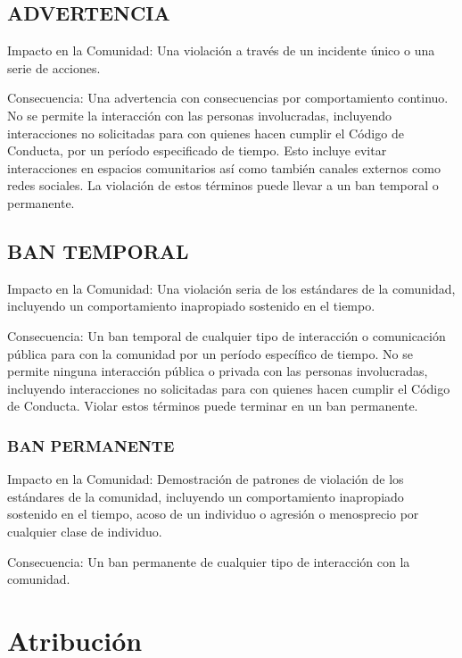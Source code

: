 \documentclass[
]{book}
\begin{document}
\hypertarget{advertencia}{%
\subsection{ADVERTENCIA}\label{advertencia}}

Impacto en la Comunidad: Una violación a través de un incidente único o una serie de acciones.

Consecuencia: Una advertencia con consecuencias por comportamiento continuo. No se permite la interacción con las personas involucradas, incluyendo interacciones no solicitadas para con quienes hacen cumplir el Código de Conducta, por un período especificado de tiempo. Esto incluye evitar interacciones en espacios comunitarios así como también canales externos como redes sociales. La violación de estos términos puede llevar a un ban temporal o permanente.

\hypertarget{ban-temporal}{%
\subsection{BAN TEMPORAL}\label{ban-temporal}}

Impacto en la Comunidad: Una violación seria de los estándares de la comunidad, incluyendo un comportamiento inapropiado sostenido en el tiempo.

Consecuencia: Un ban temporal de cualquier tipo de interacción o comunicación pública para con la comunidad por un período específico de tiempo. No se permite ninguna interacción pública o privada con las personas involucradas, incluyendo interacciones no solicitadas para con quienes hacen cumplir el Código de Conducta. Violar estos términos puede terminar en un ban permanente.

\hypertarget{ban-permanente}{%
\subsubsection{BAN PERMANENTE}\label{ban-permanente}}

Impacto en la Comunidad: Demostración de patrones de violación de los estándares de la comunidad, incluyendo un comportamiento inapropiado sostenido en el tiempo, acoso de un individuo o agresión o menosprecio por cualquier clase de individuo.

Consecuencia: Un ban permanente de cualquier tipo de interacción con la comunidad.

\hypertarget{atribuciuxf3n}{%
\section{Atribución}\label{atribuciuxf3n}}
\end{document}
